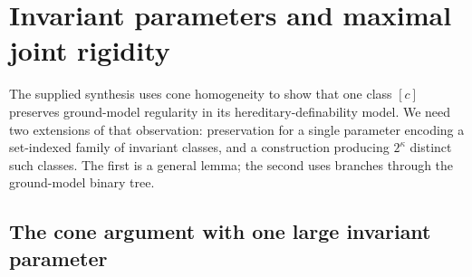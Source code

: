 \documentclass[11pt,letterpaper]{article}
\theoremstyle{definition}
\numberwithin{equation}{section}
\begin{document}
\section{Invariant parameters and maximal joint rigidity}\label{sec:maximal}

The supplied synthesis uses cone homogeneity to show that one class $[c]$ preserves ground-model regularity in its hereditary-definability model. We need two extensions of that observation: preservation for a single parameter encoding a set-indexed family of invariant classes, and a construction producing $2^\kappa$ distinct such classes. The first is a general lemma; the second uses branches through the ground-model binary tree.

\subsection{The cone argument with one large invariant parameter}
\end{document}
